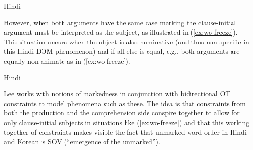 \documentclass[output=paper,hidelinks]{langscibook}
\begin{document}
\begin{exe}
  \ex \label{ex:wo-switch}
Hindi
  \begin{xlist}
      \end{xlist}
    \end{exe}
However, when
both arguments have the same case marking the clause-initial argument must be interpreted as
the subject, as illustrated in (\ref{ex:wo-freeze}).  This situation occurs when the object is also
nominative (and thus non-specific in this Hindi DOM phenomenon) and if all else
is equal, e.g., both arguments are equally non-animate as in
(\ref{ex:wo-freeze}). 

  \begin{exe}
  \ex \label{ex:wo-freeze}
  Hindi
  \begin{xlist}
      \end{xlist}
    \end{exe}
 Lee works with notions of markedness in conjunction with bidirectional OT
    constraints to model phenomena such as these.  The idea is that constraints
    from both the production and the comprehension side conspire together to
    allow for only clause-initial subjects in situations like
    (\ref{ex:wo-freeze}) and that this working together of constraints makes
    visible the fact that unmarked word order in Hindi and Korean is SOV
    (``emergence of the unmarked''). 
\end{document}
